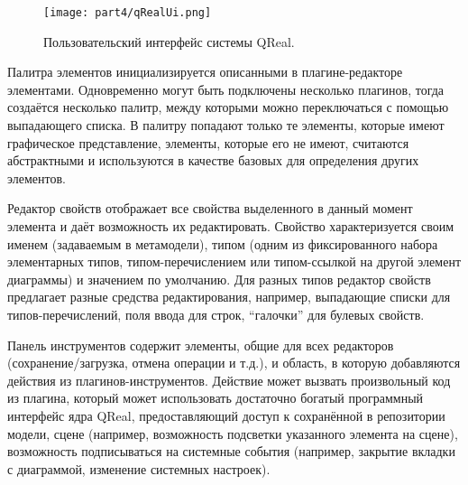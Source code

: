 \begin{figure} [ht]
	\begin{center}
		\texttt{[image: part4/qRealUi.png]}
		\caption{Пользовательский интерфейс системы QReal.}
		\label{qRealUi}
	\end{center}
\end{figure}

Палитра элементов инициализируется описанными в плагине-редакторе элементами. Одновременно 
могут быть подключены несколько плагинов, тогда создаётся  несколько палитр, между 
которыми можно переключаться с помощью выпадающего списка. В палитру попадают только 
те элементы, которые имеют графическое представление, элементы, которые его не имеют, 
считаются абстрактными и используются в качестве базовых для определения других элементов.

Редактор свойств отображает все свойства выделенного в данный момент элемента и даёт 
возможность их редактировать. Свойство характеризуется своим именем (задаваемым в метамодели), 
типом (одним из фиксированного набора элементарных типов, типом-перечислением или 
типом-ссылкой на другой элемент диаграммы) и значением по умолчанию. Для разных типов 
редактор свойств предлагает разные средства редактирования, например, выпадающие списки 
для типов-перечислений, поля ввода для строк, "`галочки"' для булевых свойств.

Панель инструментов содержит элементы, общие для всех редакторов (сохранение/загрузка, 
отмена операции и т.д.), и область, в которую добавляются действия из плагинов-инструментов. 
Действие может вызвать произвольный код из плагина, который может использовать достаточно 
богатый программный интерфейс ядра QReal, предоставляющий доступ к сохранённой в репозитории 
модели, сцене (например, возможность подсветки указанного элемента на сцене), возможность 
подписываться на системные события (например, закрытие вкладки с диаграммой, изменение 
системных настроек).


